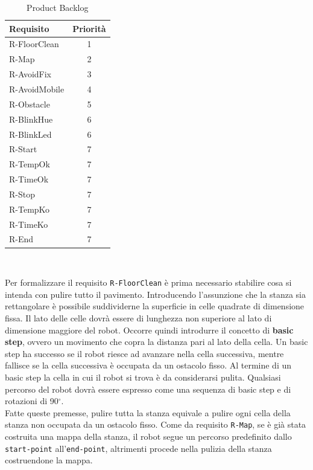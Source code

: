 \documentclass{llncs}
\newcommand{\code}[1]{{\color{blue}\small{\texttt{#1}}}}
\begin{document}
\begin{table}
	\centering
	\begin{tabular}{|l|c|}
		\hline \textbf{Requisito} & \textbf{Priorità} \\ \hline
		R-FloorClean & 1 \\ \hline
		R-Map & 2 \\ \hline
		R-AvoidFix & 3 \\ \hline
		R-AvoidMobile & 4 \\ \hline
		R-Obstacle & 5 \\ \hline
		R-BlinkHue & 6 \\ \hline
		R-BlinkLed & 6 \\ \hline
		R-Start & 7 \\ \hline
		R-TempOk & 7 \\ \hline
		R-TimeOk & 7 \\ \hline
		R-Stop & 7 \\ \hline
		R-TempKo & 7 \\ \hline
		R-TimeKo & 7 \\ \hline
		R-End & 7 \\ \hline
	\end{tabular} 
	\\[1\baselineskip]
	\caption{Product Backlog}
	\label{tab:pb}
\end{table}
Per formalizzare il requisito \code{R-FloorClean} è prima necessario stabilire cosa si intenda con pulire tutto il pavimento. Introducendo l'assunzione che la stanza sia rettangolare è possibile suddividerne la superficie in celle quadrate di dimensione fissa. Il lato delle celle dovrà essere di lunghezza non superiore al lato di dimensione maggiore del robot. Occorre quindi introdurre il concetto di \textbf{basic step}, ovvero un movimento che copra la distanza pari al lato della cella. Un basic step ha successo se il robot riesce ad avanzare nella cella successiva, mentre fallisce se la cella successiva è occupata da un ostacolo fisso. Al termine di un basic step la cella in cui il robot si trova è da considerarsi pulita. Qualsiasi percorso del robot dovrà essere espresso come una sequenza di basic step e di rotazioni di 90$^{\circ}$. \\ Fatte queste premesse, pulire tutta la stanza equivale a pulire ogni cella della stanza non occupata da un ostacolo fisso. Come da requisito \code{R-Map}, se è già stata costruita una mappa della stanza, il robot segue un percorso predefinito dallo \code{start-point} all'\code{end-point}, altrimenti procede nella pulizia della stanza costruendone la mappa. 
\end{document}
